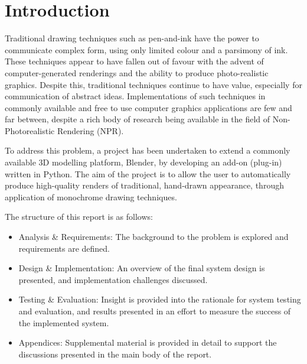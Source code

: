 

\chapter{Introduction}\label{intro}

Traditional drawing techniques such as pen-and-ink have the power to communicate complex form, using only limited colour and a parsimony of ink.
These techniques appear to have fallen out of favour with the advent of computer-generated renderings and the ability to produce photo-realistic graphics.
Despite this, traditional techniques continue to have value, especially for communication of abstract ideas.
Implementations of such techniques in commonly available and free to use computer graphics applications are few and far between, despite a rich body of research being available in the field of Non-Photorealistic Rendering (NPR).

To address this problem, a project has been undertaken to extend a commonly available 3D modelling platform, Blender, by developing an add-on (plug-in) written in Python. The aim of the project is to allow the user to automatically produce high-quality renders of traditional, hand-drawn appearance, through application of monochrome drawing techniques.

The structure of this report is as follows:

\begin{itemize}
	\item{Analysis \& Requirements: The background to the problem is explored and requirements are defined.}
	\item{Design \& Implementation: An overview of the final system design is presented, and implementation challenges discussed.}
	\item{Testing \& Evaluation: Insight is provided into the rationale for system testing and evaluation, and results presented in an effort to measure the success of the implemented system.}
	\item{Appendices: Supplemental material is provided in detail to support the discussions presented in the main body of the report.}
\end{itemize}